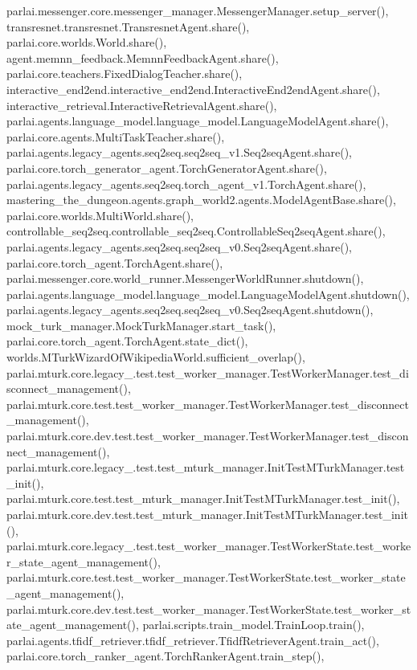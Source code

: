 parlai.\+messenger.\+core.\+messenger\+\_\+manager.\+Messenger\+Manager.\+setup\+\_\+server(), transresnet.\+transresnet.\+Transresnet\+Agent.\+share(), parlai.\+core.\+worlds.\+World.\+share(), agent.\+memnn\+\_\+feedback.\+Memnn\+Feedback\+Agent.\+share(), parlai.\+core.\+teachers.\+Fixed\+Dialog\+Teacher.\+share(), interactive\+\_\+end2end.\+interactive\+\_\+end2end.\+Interactive\+End2end\+Agent.\+share(), interactive\+\_\+retrieval.\+Interactive\+Retrieval\+Agent.\+share(), parlai.\+agents.\+language\+\_\+model.\+language\+\_\+model.\+Language\+Model\+Agent.\+share(), parlai.\+core.\+agents.\+Multi\+Task\+Teacher.\+share(), parlai.\+agents.\+legacy\+\_\+agents.\+seq2seq.\+seq2seq\+\_\+v1.\+Seq2seq\+Agent.\+share(), parlai.\+core.\+torch\+\_\+generator\+\_\+agent.\+Torch\+Generator\+Agent.\+share(), parlai.\+agents.\+legacy\+\_\+agents.\+seq2seq.\+torch\+\_\+agent\+\_\+v1.\+Torch\+Agent.\+share(), mastering\+\_\+the\+\_\+dungeon.\+agents.\+graph\+\_\+world2.\+agents.\+Model\+Agent\+Base.\+share(), parlai.\+core.\+worlds.\+Multi\+World.\+share(), controllable\+\_\+seq2seq.\+controllable\+\_\+seq2seq.\+Controllable\+Seq2seq\+Agent.\+share(), parlai.\+agents.\+legacy\+\_\+agents.\+seq2seq.\+seq2seq\+\_\+v0.\+Seq2seq\+Agent.\+share(), parlai.\+core.\+torch\+\_\+agent.\+Torch\+Agent.\+share(), parlai.\+messenger.\+core.\+world\+\_\+runner.\+Messenger\+World\+Runner.\+shutdown(), parlai.\+agents.\+language\+\_\+model.\+language\+\_\+model.\+Language\+Model\+Agent.\+shutdown(), parlai.\+agents.\+legacy\+\_\+agents.\+seq2seq.\+seq2seq\+\_\+v0.\+Seq2seq\+Agent.\+shutdown(), mock\+\_\+turk\+\_\+manager.\+Mock\+Turk\+Manager.\+start\+\_\+task(), parlai.\+core.\+torch\+\_\+agent.\+Torch\+Agent.\+state\+\_\+dict(), worlds.\+M\+Turk\+Wizard\+Of\+Wikipedia\+World.\+sufficient\+\_\+overlap(), parlai.\+mturk.\+core.\+legacy\+\_.\+test.\+test\+\_\+worker\+\_\+manager.\+Test\+Worker\+Manager.\+test\+\_\+disconnect\+\_\+management(), parlai.\+mturk.\+core.\+test.\+test\+\_\+worker\+\_\+manager.\+Test\+Worker\+Manager.\+test\+\_\+disconnect\+\_\+management(), parlai.\+mturk.\+core.\+dev.\+test.\+test\+\_\+worker\+\_\+manager.\+Test\+Worker\+Manager.\+test\+\_\+disconnect\+\_\+management(), parlai.\+mturk.\+core.\+legacy\+\_.\+test.\+test\+\_\+mturk\+\_\+manager.\+Init\+Test\+M\+Turk\+Manager.\+test\+\_\+init(), parlai.\+mturk.\+core.\+test.\+test\+\_\+mturk\+\_\+manager.\+Init\+Test\+M\+Turk\+Manager.\+test\+\_\+init(), parlai.\+mturk.\+core.\+dev.\+test.\+test\+\_\+mturk\+\_\+manager.\+Init\+Test\+M\+Turk\+Manager.\+test\+\_\+init(), parlai.\+mturk.\+core.\+legacy\+\_.\+test.\+test\+\_\+worker\+\_\+manager.\+Test\+Worker\+State.\+test\+\_\+worker\+\_\+state\+\_\+agent\+\_\+management(), parlai.\+mturk.\+core.\+test.\+test\+\_\+worker\+\_\+manager.\+Test\+Worker\+State.\+test\+\_\+worker\+\_\+state\+\_\+agent\+\_\+management(), parlai.\+mturk.\+core.\+dev.\+test.\+test\+\_\+worker\+\_\+manager.\+Test\+Worker\+State.\+test\+\_\+worker\+\_\+state\+\_\+agent\+\_\+management(), parlai.\+scripts.\+train\+\_\+model.\+Train\+Loop.\+train(), parlai.\+agents.\+tfidf\+\_\+retriever.\+tfidf\+\_\+retriever.\+Tfidf\+Retriever\+Agent.\+train\+\_\+act(), parlai.\+core.\+torch\+\_\+ranker\+\_\+agent.\+Torch\+Ranker\+Agent.\+train\+\_\+step(), 